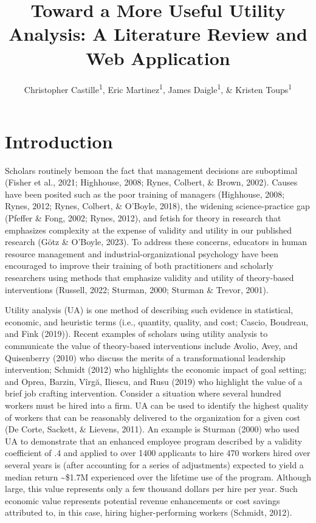 \documentclass[
  english,
  man]{apa6}
\title{Toward a More Useful Utility Analysis: A Literature Review and Web Application}
\author{Christopher Castille\textsuperscript{1}, Eric Martinez\textsuperscript{1}, James Daigle\textsuperscript{1}, \& Kristen Toups\textsuperscript{1}}
\date{}
\affiliation{\vspace{0.5cm}\textsuperscript{1} Nicholls State University}
\begin{document}
\maketitle

\section{Introduction}\label{introduction}

Scholars routinely bemoan the fact that management decisions are suboptimal (Fisher et al., 2021; Highhouse, 2008; Rynes, Colbert, \& Brown, 2002). Causes have been posited such as the poor training of managers (Highhouse, 2008; Rynes, 2012; Rynes, Colbert, \& O'Boyle, 2018), the widening science-practice gap (Pfeffer \& Fong, 2002; Rynes, 2012), and fetish for theory in research that emphasizes complexity at the expense of validity and utility in our published research (Götz \& O'Boyle, 2023). To address these concerns, educators in human resource management and industrial-organizational psychology have been encouraged to improve their training of both practitioners and scholarly researchers using methods that emphasize validity and utility of theory-based interventions (Russell, 2022; Sturman, 2000; Sturman \& Trevor, 2001).

Utility analysis (UA) is one method of describing such evidence in statistical, economic, and heuristic terms (i.e., quantity, quality, and cost; Cascio, Boudreau, and Fink (2019)). Recent examples of scholars using utility analysis to communicate the value of theory-based interventions include Avolio, Avey, and Quisenberry (2010) who discuss the merits of a transformational leadership intervention; Schmidt (2012) who highlights the economic impact of goal setting; and Oprea, Barzin, Vîrgă, Iliescu, and Rusu (2019) who highlight the value of a brief job crafting intervention. Consider a situation where several hundred workers must be hired into a firm. UA can be used to identify the highest quality of workers that can be reasonably delivered to the organization for a given cost (De Corte, Sackett, \& Lievens, 2011). An example is Sturman (2000) who used UA to demonstrate that an enhanced employee program described by a validity coefficient of .4 and applied to over 1400 applicants to hire 470 workers hired over several years is (after accounting for a series of adjustments) expected to yield a median return \textasciitilde\$1.7M experienced over the lifetime use of the program. Although large, this value represents only a few thousand dollars per hire per year. Such economic value represents potential revenue enhancements or cost savings attributed to, in this case, hiring higher-performing workers (Schmidt, 2012).
\end{document}

